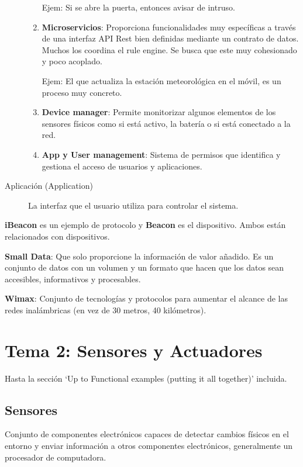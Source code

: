 \documentclass[12pt]{report} %
\begin{document}
\begin{description}
\begin{enumerate}
		Ejem: Si se abre la puerta, entonces avisar de intruso.
		\item
		\textbf{Microservicios}: Proporciona funcionalidades muy específicas a
		través de una interfaz API Rest bien definidas mediante un contrato de
		datos. Muchos los coordina el rule engine. Se busca que este muy
		cohesionado y poco acoplado.
		
		Ejem: El que actualiza la estación meteorológica en el móvil, es un
		proceso muy concreto.
		\item
		\textbf{Device manager}: Permite monitorizar algunos elementos de los
		sensores físicos como si está activo, la batería o si está conectado a
		la red.
		\item
		\textbf{App y User management}: Sistema de permisos que identifica y
		gestiona el acceso de usuarios y aplicaciones.
	\end{enumerate}

	\item[Aplicación (Application)] La interfaz que el usuario utiliza
	para controlar el sistema.

\end{description}

\textbf{iBeacon} es un ejemplo de protocolo y \textbf{Beacon} es el
dispositivo. Ambos están relacionados con dispositivos.

\textbf{Small Data}: Que solo proporcione la información de valor
añadido. Es un conjunto de datos con un volumen y un formato que hacen
que los datos sean accesibles, informativos y procesables.

\textbf{Wimax}: Conjunto de tecnologías y protocolos para aumentar el
alcance de las redes inalámbricas (en vez de 30 metros, 40 kilómetros).

\chapter{Tema 2: Sensores y
Actuadores}


Hasta la sección `Up to Functional examples
(putting it all together)' incluida.

\section{Sensores}

Conjunto de componentes electrónicos capaces de detectar cambios físicos
en el entorno y enviar información a otros componentes electrónicos,
generalmente un procesador de computadora.
\end{document}
